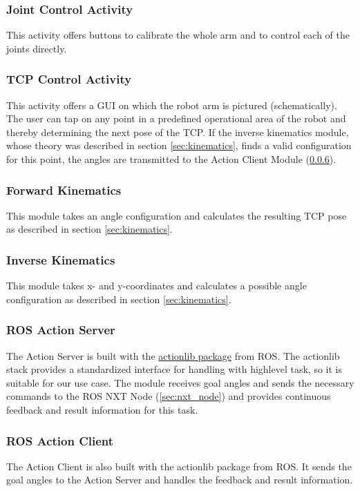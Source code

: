 \documentclass[conference]{IEEEtran}
\begin{document}
\subsubsection{Joint Control Activity}
This activity offers buttons to calibrate the whole arm and to control each of the joints directly.

\subsubsection{TCP Control Activity}
This activity offers a GUI on which the robot arm is pictured (schematically). The user can tap on any point in a predefined operational area of the robot and thereby determining the next pose of the TCP. If the inverse kinematics module, whose theory was described in section \ref{sec:kinematics}, finds a valid configuration for this point, the angles are transmitted to the Action Client Module (\ref{sec:actionclient}).

\subsubsection{Forward Kinematics}
This module takes an angle configuration and calculates the resulting TCP pose as described in section \ref{sec:kinematics}.

\subsubsection{Inverse Kinematics}
This module takes x- and y-coordinates and calculates a possible angle configuration as described in section \ref{sec:kinematics}.

\subsubsection{ROS Action Server}\label{sec:actionserver}
The Action Server is built with the \href{https://wiki.ros.org/actionlib}{actionlib package} from ROS. The actionlib stack provides a standardized interface for handling with highlevel task, so it is suitable for our use case. The module receives goal angles and sends the necessary commands to the ROS NXT Node (\ref{sec:nxt_node}) and provides continuous feedback and result information for this task.

\subsubsection{ROS Action Client}\label{sec:actionclient}
The Action Client is also built with the actionlib package from ROS. It sends the goal angles to the Action Server and handles the feedback and result information. 
\end{document}
